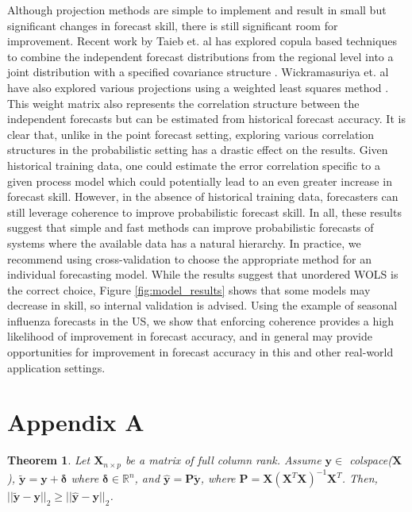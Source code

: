 \documentclass{umassthesis}          %
\newtheorem{theorem}{Theorem}
\begin{document}
   
  
   
   
   Although projection methods are simple to implement and result in small but significant changes in forecast skill, there is still significant room for improvement. Recent work by Taieb et. al has explored copula based techniques to combine the independent forecast distributions from the regional level into a joint distribution with a specified covariance structure \cite{taieb2017coherent}. Wickramasuriya et. al have also explored various projections using a weighted least squares method \cite{wickramasuriya2015forecasting}. This weight matrix also represents the correlation structure between the independent forecasts but can be estimated from historical forecast accuracy. It is clear that, unlike in the point forecast setting, exploring various correlation structures in the probabilistic setting has a drastic effect on the results. Given historical training data, one could estimate the error correlation specific to a given process model which could potentially lead to an even greater increase in forecast skill. However, in the absence of historical training data, forecasters can still leverage coherence to improve probabilistic forecast skill. In all, these results suggest that simple and fast methods can improve probabilistic forecasts of systems where the available data has a natural hierarchy. In practice, we recommend using cross-validation to choose the appropriate method for an individual forecasting model. While the results suggest that unordered WOLS is the correct choice, Figure \ref{fig:model_results} shows that some models may decrease in skill, so internal validation is advised.  Using the example of seasonal influenza forecasts in the US, we show that enforcing coherence provides a high likelihood of improvement in forecast accuracy, and in general may provide opportunities for improvement in forecast accuracy in this and other real-world application settings.
 

   
   
   
   
  \newpage
 
\section{Appendix A}

\begin{theorem}
Let $\boldsymbol{X}_{n \times p}$ be a matrix of full column rank. Assume $\bm{y} \in$ colspace($\boldsymbol{X}$), $\tilde{\bm{y}} = \bm{y}+ \bm{\delta}$ where $\bm{\delta} \in \mathbb{R}^n$, and
$\hat{\bm{y}} = \boldsymbol{P} \tilde{\bm{y}}$, where $\boldsymbol{P} = \boldsymbol{X}(\boldsymbol{X}^T\boldsymbol{X})^{-1}\boldsymbol{X}^T$.
Then, $||\tilde{\bm{y}} - \bm{y}||_2 \geq ||\hat{\bm{y}} - \bm{y}||_2$.

\end{theorem}
\end{document}
